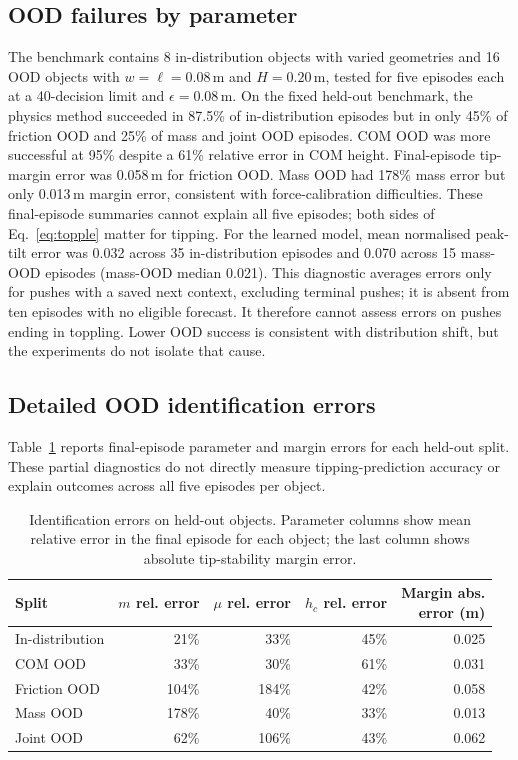 \documentclass[12pt]{article}
\begin{document}
\subsection{OOD failures by parameter}
The benchmark contains 8 in-distribution objects with varied geometries and 16 OOD objects with $w=\ell=0.08$\,m and $H=0.20$\,m, tested for five episodes each at a 40-decision limit and $\epsilon=0.08$\,m. On the fixed held-out benchmark, the physics method succeeded in 87.5\% of in-distribution episodes but in only 45\% of friction OOD and 25\% of mass and joint OOD episodes. COM OOD was more successful at 95\% despite a 61\% relative error in COM height. Final-episode tip-margin error was 0.058\,m for friction OOD. Mass OOD had 178\% mass error but only 0.013\,m margin error, consistent with force-calibration difficulties. These final-episode summaries cannot explain all five episodes; both sides of Eq.~\eqref{eq:topple} matter for tipping. For the learned model, mean normalised peak-tilt error was 0.032 across 35 in-distribution episodes and 0.070 across 15 mass-OOD episodes (mass-OOD median 0.021). This diagnostic averages errors only for pushes with a saved next context, excluding terminal pushes; it is absent from ten episodes with no eligible forecast. It therefore cannot assess errors on pushes ending in toppling. Lower OOD success is consistent with distribution shift, but the experiments do not isolate that cause.


\subsection{Detailed OOD identification errors}
Table~\ref{tab:ood_sysid} reports final-episode parameter and margin errors for each held-out split. These partial diagnostics do not directly measure tipping-prediction accuracy or explain outcomes across all five episodes per object.

\begin{table}[H]
\centering
\small
\begin{tabular}{lrrrr}
\toprule
Split & \shortstack{$m$ rel.\\error} & \shortstack{$\mu$ rel.\\error} & \shortstack{$h_c$ rel.\\error} & \shortstack{Margin abs.\\error (m)} \\
\midrule
In-distribution & 21\% & 33\% & 45\% & 0.025 \\
COM OOD & 33\% & 30\% & 61\% & 0.031 \\
Friction OOD & 104\% & 184\% & 42\% & 0.058 \\
Mass OOD & 178\% & 40\% & 33\% & 0.013 \\
Joint OOD & 62\% & 106\% & 43\% & 0.062 \\
\bottomrule
\end{tabular}
\caption{Identification errors on held-out objects. Parameter columns show mean relative error in the final episode for each object; the last column shows absolute tip-stability margin error.}
\label{tab:ood_sysid}
\end{table}
\end{document}
